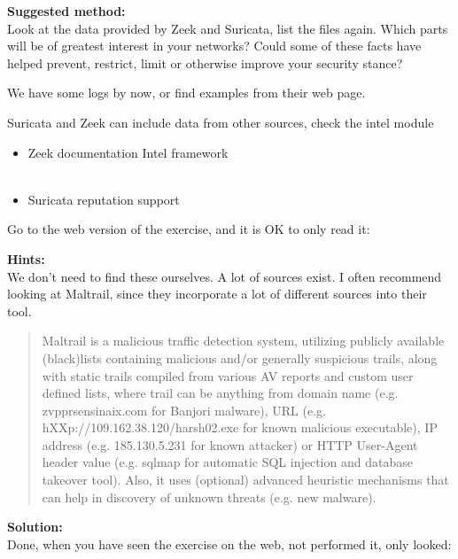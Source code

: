 \documentclass[a4paper,11pt,notitlepage]{report}
\begin{document}
{\bf Suggested method:}\\
Look at the data provided by Zeek and Suricata, list the files again.
Which parts will be of greatest interest in your networks? Could some of these facts have helped prevent, restrict, limit or otherwise improve your security stance?

We have some logs by now, or find examples from their web page.

Suricata and Zeek can include data from other sources, check the intel module\\

\begin{itemize}
\item Zeek documentation Intel framework\\
\\
\item Suricata reputation support\\
\end{itemize}

Go to the web version of the exercise, and it is OK to only read it:\\


{\bf Hints:}\\
We don't need to find these ourselves. A lot of sources exist. I often recommend looking at Maltrail, since they incorporate a lot of different sources into their tool.

\begin{quote}
  Maltrail is a malicious traffic detection system, utilizing publicly available (black)lists containing malicious and/or generally suspicious trails, along with static trails compiled from various AV reports and custom user defined lists, where trail can be anything from domain name (e.g. zvpprsensinaix.com for Banjori malware), URL (e.g. hXXp://109.162.38.120/harsh02.exe for known malicious executable), IP address (e.g. 185.130.5.231 for known attacker) or HTTP User-Agent header value (e.g. sqlmap for automatic SQL injection and database takeover tool). Also, it uses (optional) advanced heuristic mechanisms that can help in discovery of unknown threats (e.g. new malware).
\end{quote}


{\bf Solution:}\\
Done, when you have seen the exercise on the web, not performed it, only looked:
\end{document}
